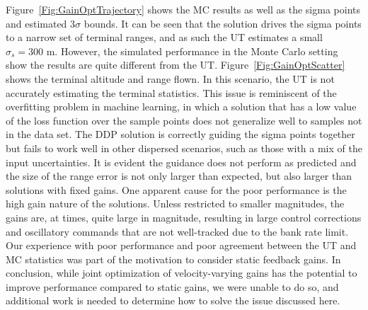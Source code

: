 Figure~\ref{Fig:GainOptTrajectory} shows the MC results as well as the sigma points and estimated 3$\sigma$ bounds. It can be seen that the solution drives the sigma points to a narrow set of terminal ranges, and as such the UT estimates a small $\sigma_s=300$ m. However, the simulated performance in the Monte Carlo setting show the results are quite different from the UT. Figure~\ref{Fig:GainOptScatter} shows the terminal altitude and range flown. In this scenario, the UT is not accurately estimating the terminal statistics. This issue is reminiscent of the overfitting problem in machine learning, in which a solution that has a low value of the loss function over the sample points does not generalize well to samples not in the data set. The DDP solution is correctly guiding the sigma points together but fails to work well in other dispersed scenarios, such as those with a mix of the input uncertainties. It is evident the guidance does not perform as predicted and the size of the range error is not only larger than expected, but also larger than solutions with fixed gains. One apparent cause for the poor performance is the high gain nature of the solutions. Unless restricted to smaller magnitudes, the gains are, at times, quite large in magnitude, resulting in large control corrections and oscillatory commands that are not well-tracked due to the bank rate limit. Our experience with poor performance and poor agreement between the UT and MC statistics was part of the motivation to consider static feedback gains. In conclusion, while joint optimization of velocity-varying gains has the potential to improve performance compared to static gains, we were unable to do so, and additional work is needed to determine how to solve the issue discussed here. 

